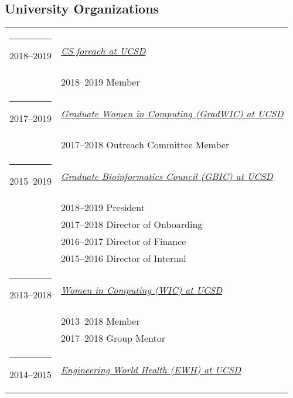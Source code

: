 \documentclass[margin,line]{res}
\begin{document}
\begin{resume}
\section{\sc University Organizations}
\begin{longtable}{@{}p{0.7in}p{4in}}\rule{-1mm}{4.5mm}
\hspace*{-4mm} 2018--2019 & \href{http://csforeach.ucsd.edu/}{\textit{CS foreach at UCSD}}\\*
\hspace*{-4mm} & \hspace{4mm} 2018--2019 Member\\
\hspace*{-4mm} \rule{-1mm}{5mm} 2017--2019 & \href{http://gradwic.ucsd.edu/}{\textit{Graduate Women in Computing (GradWIC) at UCSD}}\\*
\hspace*{-4mm} & \hspace{4mm} 2017--2018 Outreach Committee Member\\
\hspace*{-4mm} \rule{-1mm}{5mm} 2015--2019 & \href{http://bioinformatics.ucsd.edu/node/1141}{\textit{Graduate Bioinformatics Council (GBIC) at UCSD}}\\*
\hspace*{-4mm} & \hspace{4mm} 2018--2019 President\\*
\hspace*{-4mm} & \hspace{4mm} 2017--2018 Director of Onboarding\\*
\hspace*{-4mm} & \hspace{4mm} 2016--2017 Director of Finance\\*
\hspace*{-4mm} & \hspace{4mm} 2015--2016 Director of Internal\\
\hspace*{-4mm} \rule{-1mm}{5mm} 2013--2018 & \href{http://wic.ucsd.edu/}{\textit{Women in Computing (WIC) at UCSD}}\\*
\hspace*{-4mm} & \hspace{4mm} 2013--2018 Member\\*
\hspace*{-4mm} & \hspace{4mm} 2017--2018 Group Mentor\\
\hspace*{-4mm} \rule{-1mm}{5mm} 2014--2015 & \href{http://ewh.ucsd.edu/}{\textit{Engineering World Health (EWH) at UCSD}}\\

\end{longtable}
\end{resume}
\end{document}
